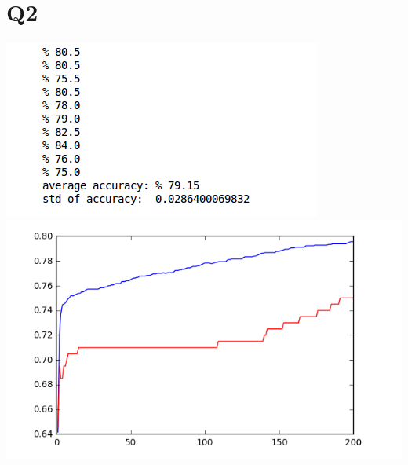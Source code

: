 \documentclass[11]{article}
\begin{document}
\section*{Q2}
\includegraphics[scale=0.75]{2-1.png} \\
\includegraphics[scale=0.75]{2-2.png} \\

 
\end{document}
